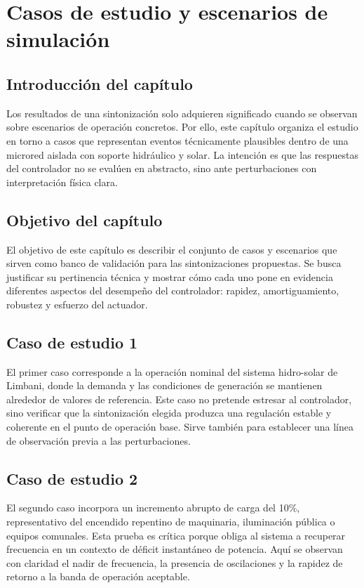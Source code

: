 \chapter{Casos de estudio y escenarios de simulación}
\label{ch:casos-estudio}

\section{Introducción del capítulo}
Los resultados de una sintonización solo adquieren significado cuando se observan sobre
escenarios de operación concretos. Por ello, este capítulo organiza el estudio en torno a casos
que representan eventos técnicamente plausibles dentro de una microred aislada con soporte
hidráulico y solar. La intención es que las respuestas del controlador no se evalúen en
abstracto, sino ante perturbaciones con interpretación física clara.

\section{Objetivo del capítulo}
El objetivo de este capítulo es describir el conjunto de casos y escenarios que sirven como
banco de validación para las sintonizaciones propuestas. Se busca justificar su pertinencia
técnica y mostrar cómo cada uno pone en evidencia diferentes aspectos del desempeño del
controlador: rapidez, amortiguamiento, robustez y esfuerzo del actuador.

\section{Caso de estudio 1}
El primer caso corresponde a la operación nominal del sistema hidro-solar de Limbani, donde la
demanda y las condiciones de generación se mantienen alrededor de valores de referencia. Este
caso no pretende estresar al controlador, sino verificar que la sintonización elegida produzca
una regulación estable y coherente en el punto de operación base. Sirve también para
establecer una línea de observación previa a las perturbaciones.

\section{Caso de estudio 2}
El segundo caso incorpora un incremento abrupto de carga del 10\%, representativo del
encendido repentino de maquinaria, iluminación pública o equipos comunales. Esta prueba es
crítica porque obliga al sistema a recuperar frecuencia en un contexto de déficit instantáneo de
potencia. Aquí se observan con claridad el nadir de frecuencia, la presencia de oscilaciones y
la rapidez de retorno a la banda de operación aceptable.

